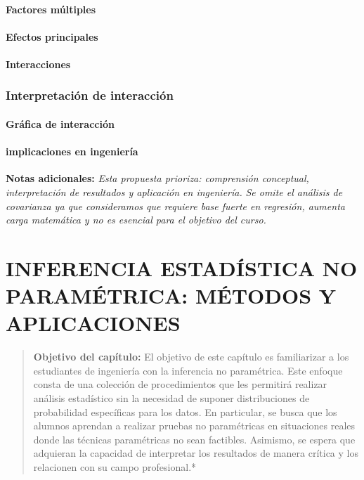 \documentclass[
  oneside]{book}
\begin{document}
\subsubsection{Factores múltiples}\label{factores-muxfaltiples}

\subsubsection{Efectos principales}\label{efectos-principales}

\subsubsection{Interacciones}\label{interacciones}

\subsection{Interpretación de interacción}\label{interpretaciuxf3n-de-interacciuxf3n}

\subsubsection{Gráfica de interacción}\label{gruxe1fica-de-interacciuxf3n}

\subsubsection{implicaciones en ingeniería}\label{implicaciones-en-ingenieruxeda}

\textbf{Notas adicionales:}
\emph{Esta propuesta prioriza: comprensión conceptual, interpretación de resultados y aplicación en ingeniería.}
\emph{Se omite el análisis de covarianza ya que consideramos que requiere base fuerte en regresión, aumenta carga matemática y no es esencial para el objetivo del curso.}

\chapter{INFERENCIA ESTADÍSTICA NO PARAMÉTRICA: MÉTODOS Y APLICACIONES}\label{inferencia-estaduxedstica-no-paramuxe9trica-muxe9todos-y-aplicaciones}

\begin{quote}
\textbf{Objetivo del capítulo:} El objetivo de este capítulo es familiarizar a los estudiantes de ingeniería con la inferencia no paramétrica. Este enfoque consta de una colección de procedimientos que les permitirá realizar análisis estadístico sin la necesidad de suponer distribuciones de probabilidad específicas para los datos. En particular, se busca que los alumnos aprendan a realizar pruebas no paramétricas en situaciones reales donde las técnicas paramétricas no sean factibles. Asimismo, se espera que adquieran la capacidad de interpretar los resultados de manera crítica y los relacionen con su campo profesional.*
\end{quote}
\end{document}

